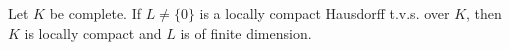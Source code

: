 Let $K$ be complete. If $L \neq \{0\}$ is a locally compact Hausdorff t.v.s. over $K$, then $K$ is locally compact and $L$ is of finite dimension.

